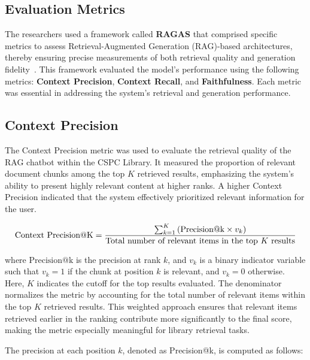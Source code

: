 \begin{refsection}
\section{Evaluation Metrics}

\hspace{0.4cm}The researchers used a framework called \textbf{RAGAS} that comprised specific metrics to assess Retrieval-Augmented Generation (RAG)-based architectures, thereby ensuring precise measurements of both retrieval quality and generation fidelity~\cite{oubah2024advanced}. This framework evaluated the model's performance using the following metrics: \textbf{Context Precision}, \textbf{Context Recall}, and \textbf{Faithfulness}. Each metric was essential in addressing the system’s retrieval and generation performance.

\subsection*{Context Precision}

The Context Precision metric was used to evaluate the retrieval quality of the RAG chatbot within the CSPC Library. It measured the proportion of relevant document chunks among the top $K$ retrieved results, emphasizing the system's ability to present highly relevant content at higher ranks. A higher Context Precision indicated that the system effectively prioritized relevant information for the user.

\begin{equation}
\centering
\text{Context Precision@K} = 
\frac{
    \sum_{k=1}^{K} \left( \text{Precision@k} \times v_k \right)
}{
    \text{Total number of relevant items in the top } K \text{ results}
}
\end{equation}

where $\text{Precision@k}$ is the precision at rank $k$, and $v_k$ is a binary indicator variable such that $v_k = 1$ if the chunk at position $k$ is relevant, and $v_k = 0$ otherwise. Here, $K$ indicates the cutoff for the top results evaluated. The denominator normalizes the metric by accounting for the total number of relevant items within the top $K$ retrieved results. This weighted approach ensures that relevant items retrieved earlier in the ranking contribute more significantly to the final score, making the metric especially meaningful for library retrieval tasks.

The precision at each position $k$, denoted as Precision@k, is computed as follows:


\end{refsection}
